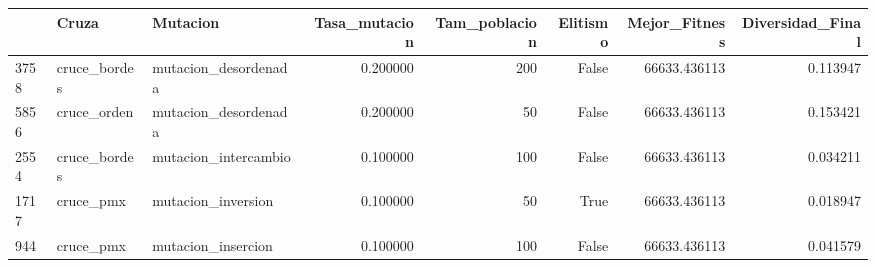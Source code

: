 \begin{tabular}{lllrrrrr}
\toprule
 & Cruza & Mutacion & Tasa_mutacion & Tam_poblacion & Elitismo & Mejor_Fitness & Diversidad_Final \\
\midrule
3758 & cruce_bordes & mutacion_desordenada & 0.200000 & 200 & False & 66633.436113 & 0.113947 \\
5856 & cruce_orden & mutacion_desordenada & 0.200000 & 50 & False & 66633.436113 & 0.153421 \\
2554 & cruce_bordes & mutacion_intercambio & 0.100000 & 100 & False & 66633.436113 & 0.034211 \\
1717 & cruce_pmx & mutacion_inversion & 0.100000 & 50 & True & 66633.436113 & 0.018947 \\
944 & cruce_pmx & mutacion_insercion & 0.100000 & 100 & False & 66633.436113 & 0.041579 \\
\bottomrule
\end{tabular}
